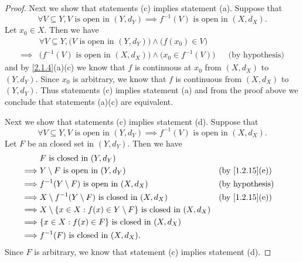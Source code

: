 \begin{proof}
  Next we show that statements (c) implies statement (a).
  Suppose that
  \[
    \forall V \subseteq Y, V \text{ is open in } (Y, d_Y) \implies f^{-1}(V) \text{ is open in } (X, d_X).
  \]
  Let \(x_0 \in X\).
  Then we have
  \begin{align*}
             & \forall V \subseteq Y, \big(V \text{ is open in } (Y, d_Y)\big) \land \big(f(x_0) \in V\big)                             \\
    \implies & \big(f^{-1}(V) \text{ is open in } (X, d_X)\big) \land \big(x_0 \in f^{-1}(V)\big)           &  & \text{(by hypothesis)}
  \end{align*}
  and by \cref{2.1.4}(a)(c) we know that \(f\) is continuous at \(x_0\) from \((X, d_X)\) to \((Y, d_Y)\).
  Since \(x_0\) is arbitrary, we know that \(f\) is continuous from \((X, d_X)\) to \((Y, d_Y)\).
  Thus statements (c) implies statement (a) and from the proof above we conclude that statements (a)(c) are equivalent.

  Next we show that statements (c) implies statement (d).
  Suppose that
  \[
    \forall V \subseteq Y, V \text{ is open in } (Y, d_Y) \implies f^{-1}(V) \text{ is open in } (X, d_X).
  \]
  Let \(F\) be an closed set in \((Y, d_Y)\).
  Then we have
  \begin{align*}
             & F \text{ is closed in } (Y, d_Y)                                                                                  \\
    \implies & Y \setminus F \text{ is open in } (Y, d_Y)                                      &  & \text{(by \cref{1.2.15}(e))} \\
    \implies & f^{-1}(Y \setminus F) \text{ is open in } (X, d_X)                              &  & \text{(by hypothesis)}       \\
    \implies & X \setminus f^{-1}(Y \setminus F) \text{ is closed in } (X, d_X)                &  & \text{(by \cref{1.2.15}(e))} \\
    \implies & X \setminus \{x \in X : f(x) \in Y \setminus F\} \text{ is closed in } (X, d_X)                                   \\
    \implies & \{x \in X : f(x) \in F\} \text{ is closed in } (X, d_X)                                                           \\
    \implies & f^{-1}(F) \text{ is closed in } (X, d_X).
  \end{align*}
  Since \(F\) is arbitrary, we know that statement (c) implies statement (d).


\end{proof}
